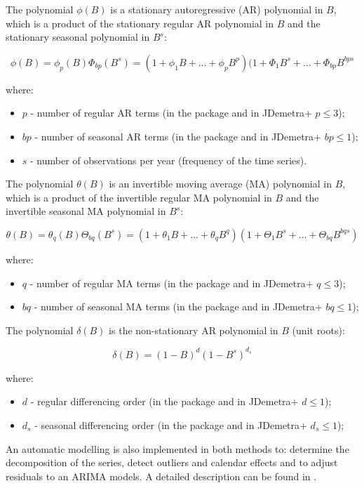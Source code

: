 \documentclass[article]{jss}
\providecommand{\tightlist}{%
  \setlength{\itemsep}{0pt}\setlength{\parskip}{0pt}}
\begin{document}
The polynomial \(\phi(B)\) is a stationary autoregressive (AR)
polynomial in \(B\), which is a product of the stationary regular AR
polynomial in \(B\) and the stationary seasonal polynomial in \(B^s\):

\[\phi(B)=\phi_p(B)\Phi_{bp}(B^s)=(1+\phi_1B+...+\phi_pB^p)(1+\Phi_1B^s+...+\Phi_{bp}B^{bps}\]

where:

\begin{itemize}
\tightlist
\item
  \(p\) - number of regular AR terms (in the package and in JDemetra+
  \(p \le 3\));
\item
  \(bp\) - number of seasonal AR terms (in the package and in JDemetra+
  \(bp \le 1\));
\item
  \(s\) - number of observations per year (frequency of the time
  series).
\end{itemize}

The polynomial \(\theta(B)\) is an invertible moving average (MA)
polynomial in \(B\), which is a product of the invertible regular MA
polynomial in \(B\) and the invertible seasonal MA polynomial in
\(B^s\):

\[\theta(B)=\theta_q(B)\Theta_{bq}(B^s)=(1+\theta_1B+...+\theta_qB^q)(1+\Theta_1B^s+...+\Theta_{bq}B^{bqs})\]

where:

\begin{itemize}
\tightlist
\item
  \(q\) - number of regular MA terms (in the package and in JDemetra+
  \(q \le 3\));
\item
  \(bq\) - number of seasonal MA terms (in the package and in JDemetra+
  \(bq \le 1\));
\end{itemize}

The polynomial \(\delta(B)\) is the non-stationary AR polynomial in
\(B\) (unit roots):

\[\delta(B)=(1-B)^d(1-B^s)^{d_s}\]

where:

\begin{itemize}
\tightlist
\item
  \(d\) - regular differencing order (in the package and in JDemetra+
  \(d \le 1\));
\item
  \(d_s\) - seasonal differencing order (in the package and in JDemetra+
  \(d_s \le 1\));
\end{itemize}

An automatic modelling is also implemented in both methods to: determine
the decomposition of the series, detect outliers and calendar effects
and to adjust residuals to an ARIMA models. A detailed description can
be found in \cite{gomez1998automatic}.
\end{document}
